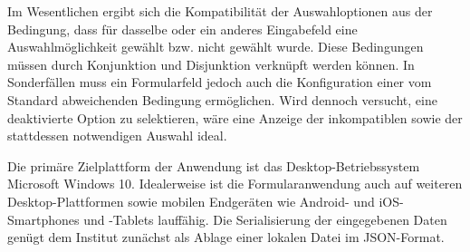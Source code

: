 \vspace{14pt}

Im Wesentlichen ergibt sich die Kompatibilität 
der Auswahloptionen aus der Bedingung, 
dass für dasselbe oder ein anderes Eingabefeld eine Auswahlmöglichkeit gewählt bzw.
nicht gewählt wurde. Diese Bedingungen müssen durch 
Konjunktion und Disjunktion verknüpft werden können.
In Sonderfällen muss ein Formularfeld jedoch auch 
die Konfiguration einer vom Standard abweichenden Bedingung
ermöglichen. 
Wird dennoch versucht,
eine deaktivierte Option zu selektieren, wäre eine Anzeige der
inkompatiblen sowie der stattdessen notwendigen Auswahl ideal.

\vspace{14pt}
Die primäre Zielplattform der Anwendung ist das Desktop-Betriebssystem
Microsoft Windows 10.
Idealerweise ist die Formularanwendung auch auf weiteren Desktop-Plattformen sowie
mobilen Endgeräten wie Android- und iOS-Smartphones und -Tablets
lauffähig. Die Serialisierung der eingegebenen Daten genügt dem Institut 
zunächst als Ablage einer lokalen Datei im JSON-Format. 












